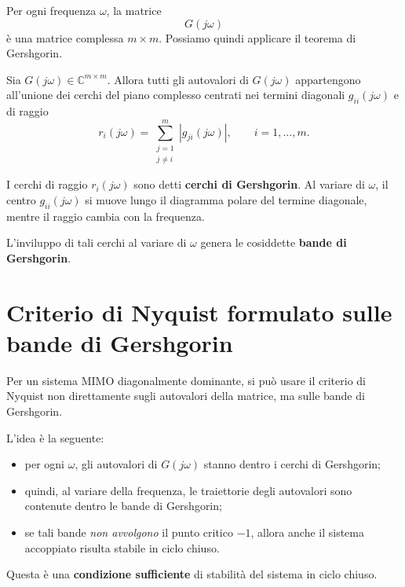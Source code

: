 Per ogni frequenza \(\omega\), la matrice
\[
G(j\omega)
\]
è una matrice complessa \(m\times m\). Possiamo quindi applicare il teorema di Gershgorin.

\begin{theorem}[Gershgorin]
Sia \(G(j\omega)\in\mathbb{C}^{m\times m}\). Allora tutti gli autovalori di \(G(j\omega)\) appartengono all'unione dei cerchi del piano complesso centrati nei termini diagonali \(g_{ii}(j\omega)\) e di raggio
\[
r_i(j\omega)=\sum_{\substack{j=1\\j\neq i}}^{m}|g_{ji}(j\omega)|,
\qquad i=1,\dots,m.
\]
\end{theorem}

I cerchi di raggio \(r_i(j\omega)\) sono detti \textbf{cerchi di Gershgorin}.  
Al variare di \(\omega\), il centro \(g_{ii}(j\omega)\) si muove lungo il diagramma polare del termine diagonale, mentre il raggio cambia con la frequenza.

L'inviluppo di tali cerchi al variare di \(\omega\) genera le cosiddette \textbf{bande di Gershgorin}.

\section{Criterio di Nyquist formulato sulle bande di Gershgorin}

Per un sistema MIMO diagonalmente dominante, si può usare il criterio di Nyquist non direttamente sugli autovalori della matrice, ma sulle bande di Gershgorin.

L'idea è la seguente:

\begin{itemize}
    \item per ogni \(\omega\), gli autovalori di \(G(j\omega)\) stanno dentro i cerchi di Gershgorin;
    \item quindi, al variare della frequenza, le traiettorie degli autovalori sono contenute dentro le bande di Gershgorin;
    \item se tali bande \emph{non avvolgono} il punto critico \(-1\), allora anche il sistema accoppiato risulta stabile in ciclo chiuso.
\end{itemize}

Questa è una \textbf{condizione sufficiente} di stabilità del sistema in ciclo chiuso.

